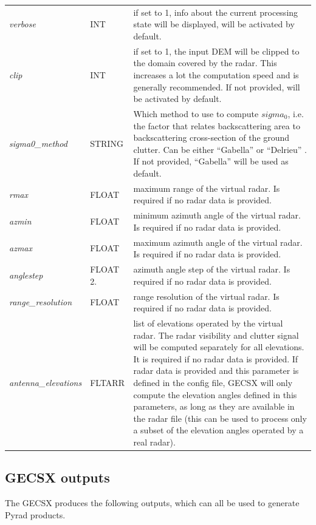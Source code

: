 \documentclass[a4paper,11pt,pdftex,twoside]{scrartcl}
\begin{document}
{{{\begin{longtable}{p{}p{}p{}}
    \textit{verbose} & INT & if set to 1, info about the current processing state will be displayed, will be activated by default. \\
    \textit{clip} & INT & if set to 1, the input DEM will be clipped to the domain covered by the radar. This increases a lot the computation speed and is generally recommended. If not provided, will be activated by default. \\
    \textit{sigma0\_method} & STRING & Which method to use to compute $sigma_0$, i.e. the factor that relates backscattering area to backscattering cross-section of the ground clutter. Can be either ``Gabella'' \citep{Gabella_JAOT_1998} or ``Delrieu'' \citep{Delrieu_JAOT_1995}. If not provided,  ``Gabella'' will be used as default.\\
     \textit{rmax}  &  FLOAT & maximum range of the virtual radar. Is required if no radar data is provided.\\
    \textit{azmin}   & FLOAT & minimum azimuth angle of the virtual radar. Is required if no radar data is provided.\\
    \textit{azmax}    &    FLOAT & maximum azimuth angle of the virtual radar. Is required if no radar data is provided.\\
    \textit{anglestep}  &  FLOAT 2.  & azimuth angle step of the virtual radar. Is required if no radar data is provided.\\
    \textit{range\_resolution} & FLOAT & range resolution of the virtual radar. Is required if no radar data is provided.\\
    \textit{antenna\_elevations} & FLTARR & list of elevations operated by the virtual radar. The radar visibility and clutter signal will be computed separately for all elevations. It is required if no radar data is provided. If radar data is provided and this parameter is defined in the config file, GECSX will only compute the elevation angles defined in this parameters, as long as they are available in the radar file (this can be used to process only a subset of the elevation angles operated by a real radar).\\
\end{longtable} 

\subsection{GECSX outputs}

The GECSX produces the following outputs, which can all be used to generate Pyrad products.

}}}
\end{document}
